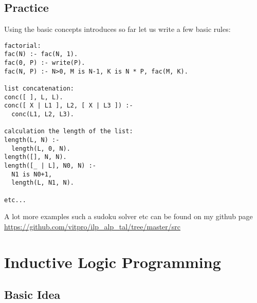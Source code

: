 \documentclass[11pt]{article}
\begin{document}
\subsection{Practice}
Using the basic concepts introduces so far let us write a few basic rules:
\begin{lstlisting}
factorial:
fac(N) :- fac(N, 1).
fac(0, P) :- write(P).
fac(N, P) :- N>0, M is N-1, K is N * P, fac(M, K).

list concatenation:
conc([ ], L, L).
conc([ X | L1 ], L2, [ X | L3 ]) :- 
  conc(L1, L2, L3).

calculation the length of the list:
length(L, N) :-
  length(L, 0, N).
length([], N, N).
length([_ | L], N0, N) :-
  N1 is N0+1,
  length(L, N1, N).

etc...
\end{lstlisting}
A lot more examples such a sudoku solver etc can be found on my github page \url{https://github.com/vitpro/ilp_alp_tal/tree/master/src}


\section{Inductive Logic Programming}

\subsection{Basic Idea}
\end{document}
